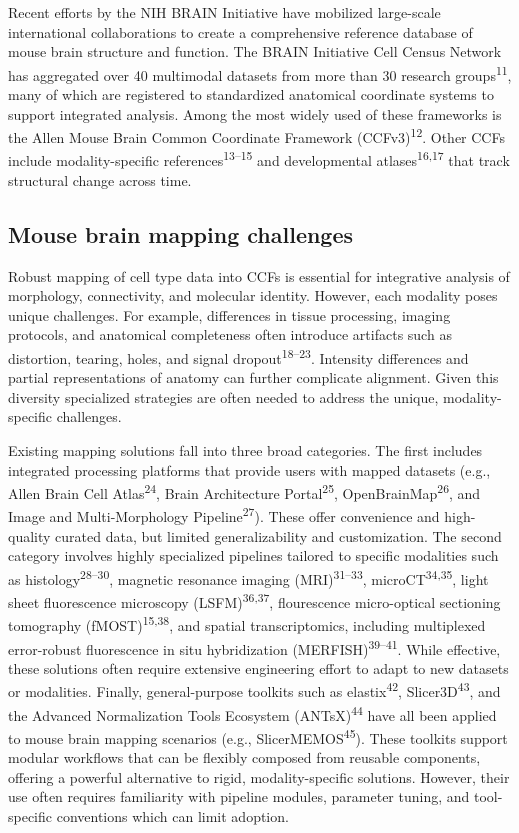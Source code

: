 \documentclass[
  12pt,
]{article}
\begin{document}
Recent efforts by the NIH BRAIN Initiative have mobilized large-scale
international collaborations to create a comprehensive reference
database of mouse brain structure and function. The BRAIN Initiative
Cell Census Network has aggregated over 40 multimodal datasets from more
than 30 research groups\textsuperscript{11}, many of which are
registered to standardized anatomical coordinate systems to support
integrated analysis. Among the most widely used of these frameworks is
the Allen Mouse Brain Common Coordinate Framework
(CCFv3)\textsuperscript{12}. Other CCFs include modality-specific
references\textsuperscript{13--15} and developmental
atlases\textsuperscript{16,17} that track structural change across time.

\subsection{Mouse brain mapping
challenges}\label{mouse-brain-mapping-challenges}

Robust mapping of cell type data into CCFs is essential for integrative
analysis of morphology, connectivity, and molecular identity. However,
each modality poses unique challenges. For example, differences in
tissue processing, imaging protocols, and anatomical completeness often
introduce artifacts such as distortion, tearing, holes, and signal
dropout\textsuperscript{18--23}. Intensity differences and partial
representations of anatomy can further complicate alignment. Given this
diversity specialized strategies are often needed to address the unique,
modality-specific challenges.

Existing mapping solutions fall into three broad categories. The first
includes integrated processing platforms that provide users with mapped
datasets (e.g., Allen Brain Cell Atlas\textsuperscript{24}, Brain
Architecture Portal\textsuperscript{25},
OpenBrainMap\textsuperscript{26}, and Image and Multi-Morphology
Pipeline\textsuperscript{27}). These offer convenience and high-quality
curated data, but limited generalizability and customization. The second
category involves highly specialized pipelines tailored to specific
modalities such as histology\textsuperscript{28--30}, magnetic resonance
imaging (MRI)\textsuperscript{31--33}, microCT\textsuperscript{34,35},
light sheet fluorescence microscopy (LSFM)\textsuperscript{36,37},
flourescence micro-optical sectioning tomography
(fMOST)\textsuperscript{15,38}, and spatial transcriptomics, including
multiplexed error-robust fluorescence in situ hybridization
(MERFISH)\textsuperscript{39--41}. While effective, these solutions
often require extensive engineering effort to adapt to new datasets or
modalities. Finally, general-purpose toolkits such as
elastix\textsuperscript{42}, Slicer3D\textsuperscript{43}, and the
Advanced Normalization Tools Ecosystem (ANTsX)\textsuperscript{44} have
all been applied to mouse brain mapping scenarios (e.g.,
SlicerMEMOS\textsuperscript{45}). These toolkits support modular
workflows that can be flexibly composed from reusable components,
offering a powerful alternative to rigid, modality-specific solutions.
However, their use often requires familiarity with pipeline modules,
parameter tuning, and tool-specific conventions which can limit
adoption.
\end{document}

